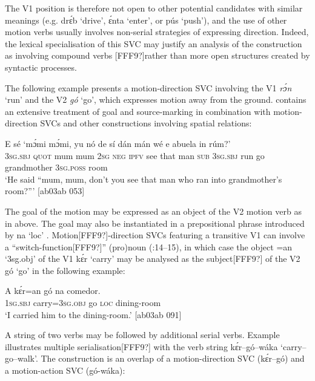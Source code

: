 The V1 position is therefore not open to other potential candidates with similar meanings (e.g. drɛ́b ‘drive’, ɛ́nta ‘enter’, or pús ‘push’), and the use of other motion verbs usually involves non-serial strategies of expressing direction. Indeed, the lexical specialisation of this SVC may justify an analysis of the construction as involving compound verbs [FFF9?]rather than more open structures created by syntactic processes. 



The following example presents a motion-direction SVC involving the V1 \textit{rɔ́n} ‘run’ and the V2 \textit{gó} ‘go’, which expresses motion away from the ground.  contains an extensive treatment of goal and source-marking in combination with motion-direction SVCs and other constructions involving spatial relations:



\ea%
    \label{ex:key:1543}
    \gll E    sé    ‘mɔ́mi  mɔ́mi,  yu  nó  de  sí  dán  mán    wé  e
      abuela    in    rúm?’\\
\textsc{3sg.sbj}  \textsc{quot}     mum  mum  \textsc{2sg}  \textsc{neg}  \textsc{ipfv}  see  that  man    \textsc{sub}  \textsc{3sg.sbj}
run    go  grandmother  \textsc{3sg.poss}  room\\

\glt ‘He said “mum, mum, don’t you see that man who ran into 
grandmother’s room?”’ [ab03ab 053]
\z

The goal of the motion may be expressed as an object of the V2 motion verb as in  above. The goal may also be instantiated in a prepositional phrase introduced by na ‘loc’ . Motion[FFF9?]-direction SVCs featuring a transitive V1 can involve a “switch-function[FFF9?]” (pro)noun (\citealt{Aikhenvald2006}:14–15), in which case the object =an ‘3sg.obj’ of the V1 kɛ́r ‘carry’ may be analysed as the subject[FFF9?] of the V2 gó ‘go’ in the following example:


\ea%
    \label{ex:key:1544}
    \gll A    kɛ́r=an      gó  na  comedor.\\
\textsc{1sg.sbj}  carry=\textsc{3sg.obj}    go  \textsc{loc}  dining-room\\

\glt ‘I carried him to the dining-room.’ [ab03ab 091]
\z

A string of two verbs may be followed by additional serial verbs. Example  illustrates multiple serialisation[FFF9?] with the verb string kɛ́r–gó–wáka ‘carry–go–walk’. The construction is an overlap of a motion-direction SVC (kɛ́r–gó) and a motion-action SVC (gó-wáka): 


